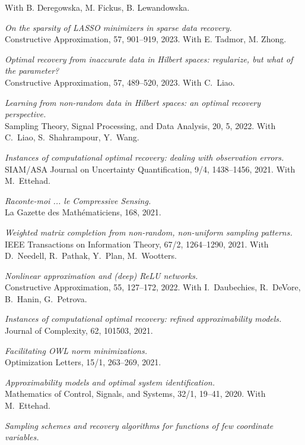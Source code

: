\documentclass[11pt]{article}
\begin{document}
With B. Deregowska, M. Fickus,  B. Lewandowska.
\item {\sl On the sparsity of LASSO minimizers in sparse data recovery.}\\
Constructive Approximation, 57, 901--919, 2023. With E. Tadmor, M.  Zhong.
\item {\sl Optimal recovery from inaccurate data in Hilbert spaces: regularize, but what of the parameter?}\\
Constructive Approximation, 57, 489--520, 2023.  With C.~Liao.
\item {\sl Learning from non-random data in Hilbert spaces: an optimal recovery perspective.}\\
Sampling Theory, Signal Processing, and Data Analysis,
20, 5, 2022.
With C.~Liao, S.~Shahrampour, Y.~Wang. 
\item {\sl Instances of computational optimal recovery: dealing with observation errors.}\\
SIAM/ASA Journal on Uncertainty Quantification, 9/4, 1438--1456, 2021. 
With M.~Ettehad.
\item {\sl Raconte-moi ... le Compressive Sensing.}\\
La Gazette des Math\'ematiciens, 168, 2021. 
\item {\sl Weighted matrix completion from non-random, non-uniform sampling patterns.}\\
IEEE Transactions on Information Theory, 67/2, 1264--1290, 2021.
With D.~Needell, R.~Pathak, Y.~Plan, \mbox{M.~Wootters}.
\item {\sl Nonlinear approximation and (deep) ReLU networks.}\\
Constructive Approximation,  55, 127--172, 2022.
With I.~Daubechies, R.~DeVore, B.~Hanin, G.~Petrova.
\item {\sl Instances of computational optimal recovery: refined approximability models.}\\
Journal of Complexity, 62, 101503, 2021.
\item {\sl Facilitating OWL norm minimizations.}\\
Optimization Letters, 15/1, 263--269, 2021.
\item {\sl Approximability models and optimal system identification.}\\
Mathematics of Control, Signals, and Systems, 32/1, 19--41, 2020.
With M.~Ettehad.
\item {\sl Sampling schemes and recovery algorithms for functions of few coordinate variables.}\\
\end{document}
